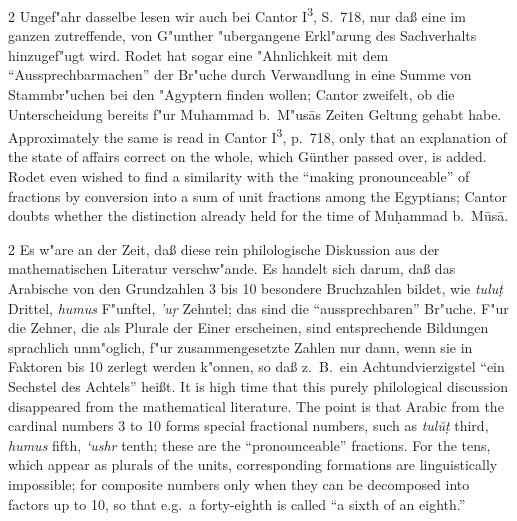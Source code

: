 \documentclass[10pt,a4paper]{article}
\renewcommand{\switchcolumn}{\syncronize\nointerlineskip\columnbreak}
\newcommand{\s}[1]{\d{#1}}
\newcommand{\enquote}[1]{``#1''}
\begin{document}
\begin{paracol}{2}
Ungef"ahr dasselbe lesen wir auch bei Cantor I\textsuperscript{3}, S.\ 718, nur da\ss{} eine im ganzen zutreffende, von G"unther "ubergangene Erkl"arung des Sachverhalts hinzugef"ugt wird. Rodet hat sogar eine "Ahnlichkeit mit dem \enquote{Aussprechbarmachen} der Br"uche durch Verwandlung in eine Summe von Stammbr"uchen bei den "Agyptern finden wollen; Cantor zweifelt, ob die Unterscheidung bereits f"ur Muhammad b.\ M"us\=as Zeiten Geltung gehabt habe.
\switchcolumn
Approximately the same is read in Cantor I\textsuperscript{3}, p.\ 718, only that an explanation of the state of affairs correct on the whole, which G\"unther passed over, is added. Rodet even wished to find a similarity with the ``making pronounceable'' of fractions by conversion into a sum of unit fractions among the Egyptians; Cantor doubts whether the distinction already held for the time of Mu\d{h}ammad b.\ M\=us\=a.
\end{paracol}

\begin{paracol}{2}
Es w"are an der Zeit, da\ss{} diese rein philologische Diskussion aus der mathematischen Literatur verschw"ande. Es handelt sich darum, da\ss{} das Arabische von den Grundzahlen 3 bis 10 besondere Bruchzahlen bildet, wie \textit{tulu\d{t}} Drittel, \textit{humus} F"unftel, \textit{'u\s{r}} Zehntel; das sind die \enquote{aussprechbaren} Br"uche. F"ur die Zehner, die als Plurale der Einer erscheinen, sind entsprechende Bildungen sprachlich unm"oglich, f"ur zusammengesetzte Zahlen nur dann, wenn sie in Faktoren bis 10 zerlegt werden k"onnen, so da\ss{} z.\ B.\ ein Achtundvierzigstel \enquote{ein Sechstel des Achtels} hei\ss{}t.
\switchcolumn
It is high time that this purely philological discussion disappeared from the mathematical literature. The point is that Arabic from the cardinal numbers 3 to 10 forms special fractional numbers, such as \textit{tul\u{u}\d{t}} third, \textit{humus} fifth, \textit{`ushr} tenth; these are the ``pronounceable'' fractions. For the tens, which appear as plurals of the units, corresponding formations are linguistically impossible; for composite numbers only when they can be decomposed into factors up to 10, so that e.g.\ a forty-eighth is called ``a sixth of an eighth.''
\end{paracol}
\end{document}
